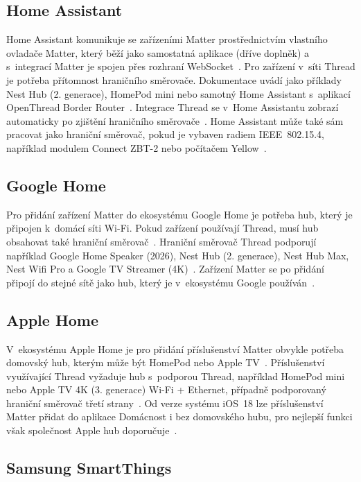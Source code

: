 \subsection{Home Assistant}

Home Assistant komunikuje se zařízeními Matter prostřednictvím vlastního
ovladače Matter, který běží jako samostatná aplikace (dříve doplněk) a s~integrací
Matter je spojen přes rozhraní WebSocket~\cite{ha-matter}. Pro zařízení v~síti
Thread je potřeba přítomnost hraničního směrovače. Dokumentace uvádí
jako příklady Nest Hub (2. generace), HomePod mini nebo samotný Home Assistant
s~aplikací OpenThread Border Router~\cite{ha-matter}. Integrace Thread se v~Home Assistantu zobrazí
automaticky po zjištění hraničního směrovače~\cite{ha-thread}. Home
Assistant může také sám pracovat jako hraniční směrovač, pokud je
vybaven radiem IEEE~802.15.4, například modulem Connect ZBT-2 nebo
počítačem Yellow~\cite{ha-thread}.

\subsection{Google Home}

Pro přidání zařízení Matter do ekosystému Google Home je potřeba hub, který
je připojen k~domácí síti Wi-Fi. Pokud zařízení používají Thread, musí hub
obsahovat také hraniční směrovač~\cite{google-matter-prepare}. Hraniční směrovač
Thread podporují například Google Home Speaker (2026), Nest Hub
(2. generace), Nest Hub Max, Nest Wifi Pro a Google TV Streamer
(4K)~\cite{google-matter-prepare}. Zařízení Matter se po přidání připojí do
stejné sítě jako hub, který je v~ekosystému Google používán~\cite{google-home-matter}.

\subsection{Apple Home}

V~ekosystému Apple Home je pro přidání příslušenství Matter obvykle potřeba
domovský hub, kterým může být HomePod nebo Apple TV~\cite{apple-home-hub}. Příslušenství
využívající Thread vyžaduje hub s~podporou Thread, například HomePod mini nebo
Apple TV 4K (3. generace) Wi-Fi + Ethernet, případně podporovaný hraniční směrovač
třetí strany~\cite{apple-home-hub}. Od verze systému iOS~18 lze příslušenství
Matter přidat do aplikace Domácnost i bez domovského hubu, pro nejlepší
funkci však společnost Apple hub doporučuje~\cite{apple-matter-pair}.

\subsection{Samsung SmartThings}

